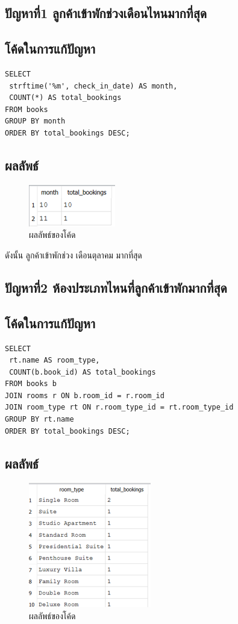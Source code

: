 \documentclass{report}
\begin{document}
\subsection{ปัญหาที่1 ลูกค้าเข้าพักช่วงเดือนไหนมากที่สุด}
\subsection{โค้ดในการแก้ปัญหา}
\begin{verbatim}
SELECT 
 strftime('%m', check_in_date) AS month, 
 COUNT(*) AS total_bookings
FROM books
GROUP BY month
ORDER BY total_bookings DESC;
\end{verbatim}

\subsection{ผลลัพธ์}

\begin{figure}[h!]
\centering
\includegraphics[scale=0.75]{month.png}
\caption{ผลลัพธ์ของโค้ด} 
\label{fig:graph13}
\end{figure} 

ดังนั้น ลูกค้าเข้าพักช่วง เดือนตุลาคม มากที่สุด

\pagebreak

\subsection{ปัญหาที่2 ห้องประเภทไหนที่ลูกค้าเข้าพักมากที่สุด}
\subsection{โค้ดในการแก้ปัญหา}
\begin{verbatim}
SELECT 
 rt.name AS room_type, 
 COUNT(b.book_id) AS total_bookings
FROM books b
JOIN rooms r ON b.room_id = r.room_id
JOIN room_type rt ON r.room_type_id = rt.room_type_id
GROUP BY rt.name
ORDER BY total_bookings DESC;
\end{verbatim}

\subsection{ผลลัพธ์}
\begin{figure}[h!]
\centering
\includegraphics[scale=0.75]{room.png}
\caption{ผลลัพธ์ของโค้ด} 
\label{fig:graph14}
\end{figure} 
\end{document}
